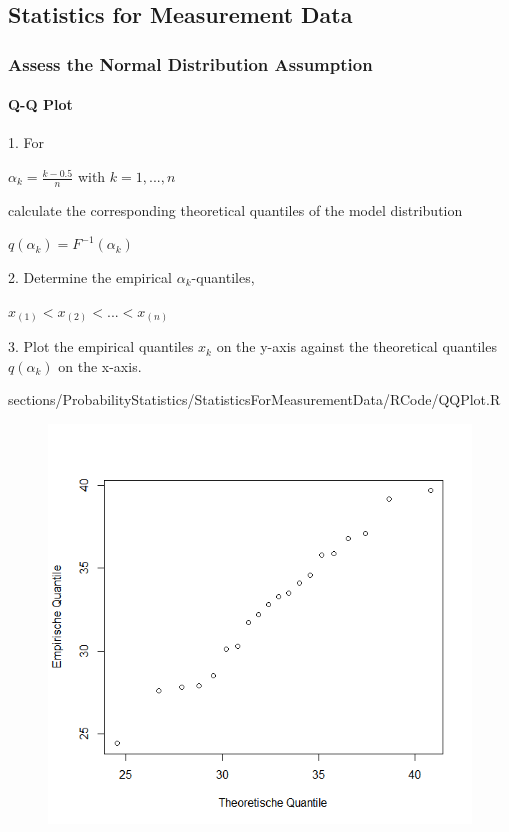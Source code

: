 \subsection{Statistics for Measurement Data}


\subsubsection{Assess the Normal Distribution Assumption}
{
		\paragraph{Q-Q Plot}
				\RTheory%
				{%
				1. For
				 \begin{center}
				 $\alpha_k=\frac{k-0.5}{n}$ with $k=1,...,n$\\
				 \end{center}
				 calculate the corresponding theoretical quantiles of the model distribution
				 \begin{center}
				  $q(\alpha_k)=F^{-1}(\alpha_k)$\\
				 \end{center}				 
				 2. Determine the empirical $\alpha_k$-quantiles,
				 \begin{center}
				  $x_{(1)}<x_{(2)}<...<x_{(n)}$\\
				 \end{center}				 
				3. Plot the empirical quantiles $x_k$ on the y-axis against the theoretical quantiles 					$q(\alpha_k)$ on the x-axis.		 
				}
				{
				sections/ProbabilityStatistics/StatisticsForMeasurementData/RCode/QQPlot.R
				}
\begin{figure}[H]
\begin{minipage}[c]{0.5\textwidth}
    \includegraphics[width=1\linewidth]{images/qqPlot.png}

\end{minipage}
\end{figure}}
